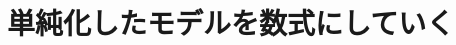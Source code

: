 \documentclass[11pt,a4paper]{jsarticle}
\begin{document}
%
%
\section*{単純化したモデルを数式にしていく}



%
%
\end{document}
